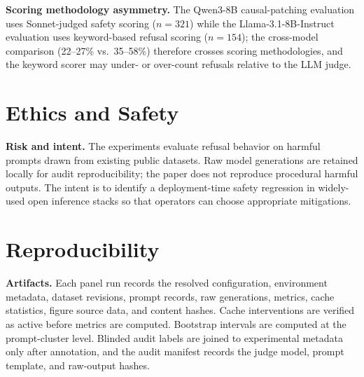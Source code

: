 \documentclass{article}
\begin{document}
\textbf{Scoring methodology asymmetry.} The Qwen3-8B causal-patching evaluation uses Sonnet-judged safety scoring ($n = 321$) while the Llama-3.1-8B-Instruct evaluation uses keyword-based refusal scoring ($n = 154$); the cross-model comparison (22--27\% vs.\ 35--58\%) therefore crosses scoring methodologies, and the keyword scorer may under- or over-count refusals relative to the LLM judge.

\section{Ethics and Safety}

\textbf{Risk and intent.} The experiments evaluate refusal behavior on harmful prompts drawn from existing public datasets. Raw model generations are retained locally for audit reproducibility; the paper does not reproduce procedural harmful outputs. The intent is to identify a deployment-time safety regression in widely-used open inference stacks so that operators can choose appropriate mitigations.

\section{Reproducibility}

\textbf{Artifacts.} Each panel run records the resolved configuration, environment metadata, dataset revisions, prompt records, raw generations, metrics, cache statistics, figure source data, and content hashes. Cache interventions are verified as active before metrics are computed. Bootstrap intervals are computed at the prompt-cluster level. Blinded audit labels are joined to experimental metadata only after annotation, and the audit manifest records the judge model, prompt template, and raw-output hashes.



\end{document}
